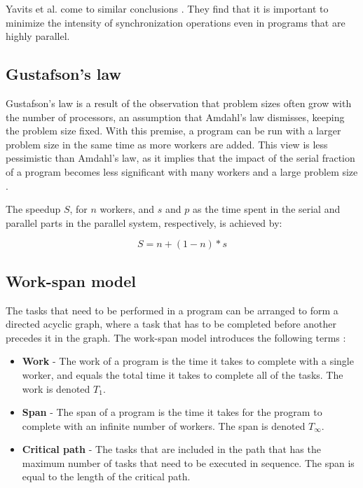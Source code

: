 Yavits et al. come to similar conclusions \cite{yavits_2014_effect_teocasoalims}. They find that it is important to minimize the
intensity of synchronization operations even in programs that are highly parallel.

\subsection{Gustafson's law}
Gustafson's law \cite{gustafson_1988_reevaluating_ral} is a result of the observation that problem sizes often grow with the
number of processors, an assumption that Amdahl's law dismisses, keeping the problem size fixed. With this premise, a program can
be run with a larger problem size in the same time as more workers are added. This view is less pessimistic than Amdahl's law, as
it implies that the impact of the serial fraction of a program becomes less significant with many workers and a large problem
size \cite[p. 61-62]{mccool_2012_structured_spppfec}.

The speedup $S$, for $n$ workers, and $s$ and $p$ as the time spent in the serial and parallel parts in the parallel system,
respectively, is achieved by:

\begin{displaymath}
  S = n + (1-n) * s
\end{displaymath}

\subsection{Work-span model}
The tasks that need to be performed in a program can be arranged to form a directed acyclic graph, where a task that
has to be completed before another precedes it in the graph. The work-span model introduces the following terms
\cite[p. 62-65]{mccool_2012_structured_spppfec}:
\begin{itemize}
  \item \textbf{Work} - The work of a program is the time it takes to complete with a single worker, and equals the total time it
    takes to complete all of the tasks. The work is denoted $T_1$.
  \item \textbf{Span} - The span of a program is the time it takes for the program to complete with an infinite number of workers.
    The span is denoted $T_\infty$.
  \item \textbf{Critical path} - The tasks that are included in the path that has the maximum number of tasks that need
    to be executed in sequence. The span is equal to the length of the critical path.
\end{itemize}

